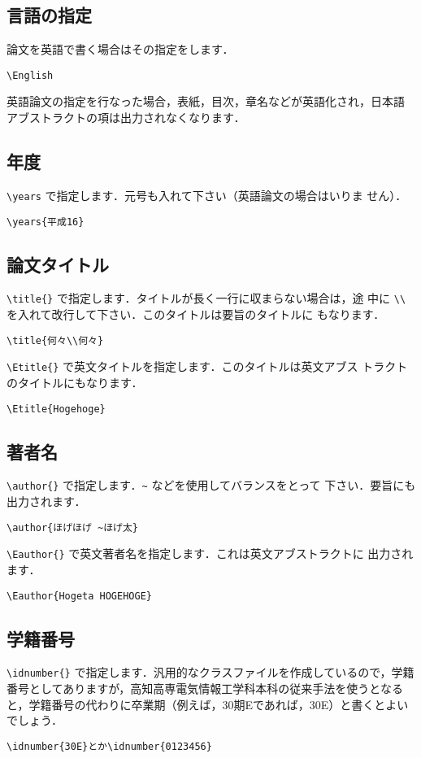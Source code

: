 \documentclass[mingoth]{knct-paper}		%
\begin{document}
  \subsection{言語の指定}
  論文を英語で書く場合はその指定をします．
\begin{verbatim}
\English
\end{verbatim}

  英語論文の指定を行なった場合，表紙，目次，章名などが英語化され，日本語
  アブストラクトの項は出力されなくなります．

  \subsection{年度}
  \verb|\years| で指定します．元号も入れて下さい（英語論文の場合はいりま
  せん）．
\begin{verbatim}
\years{平成16}
\end{verbatim}

  \subsection{論文タイトル}
  \verb|\title{}| で指定します．タイトルが長く一行に収まらない場合は，途
  中に \verb|\\| を入れて改行して下さい．このタイトルは要旨のタイトルに
  もなります．
\begin{verbatim}
\title{何々\\何々}
\end{verbatim}

  \verb|\Etitle{}| で英文タイトルを指定します．このタイトルは英文アブス
  トラクトのタイトルにもなります．
\begin{verbatim}
\Etitle{Hogehoge}
\end{verbatim}

  \subsection{著者名}
  \verb|\author{}| で指定します．\verb|~| などを使用してバランスをとって
  下さい．要旨にも出力されます．
\begin{verbatim}
\author{ほげほげ ~ほげ太}
\end{verbatim}

  \verb|\Eauthor{}| で英文著者名を指定します．これは英文アブストラクトに
  出力されます．
\begin{verbatim}
\Eauthor{Hogeta HOGEHOGE}
\end{verbatim}

  \subsection{学籍番号}
  \verb|\idnumber{}| で指定します．汎用的なクラスファイルを作成しているので，学籍番号としてありますが，高知高専電気情報工学科本科の従来手法を使うとなると，学籍番号の代わりに卒業期（例えば，30期Eであれば，30E）と書くとよいでしょう．
\begin{verbatim}
\idnumber{30E}とか\idnumber{0123456}
\end{verbatim}
\end{document}
